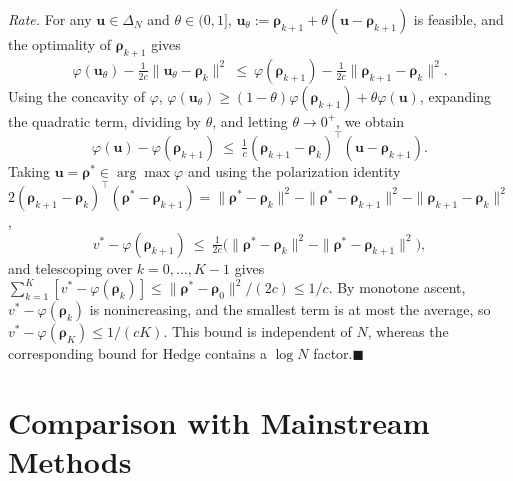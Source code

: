 \documentclass{article} %
\theoremstyle{plain}
\theoremstyle{remark}
\newcommand{\simplex}{\Delta}
\newcommand{\bu}{{\bm{u}}}
\newcommand{\brho}{{\bm{\rho}}}
\begin{document}
\textit{Rate.} For any $\bu\in\simplex_N$ and $\theta\in(0,1]$, $\bu_\theta:=\brho_{k+1}+\theta(\bu-\brho_{k+1})$ is feasible, and the optimality of $\brho_{k+1}$ gives
\[
\varphi(\bu_\theta)-\tfrac1{2c}\|\bu_\theta-\brho_k\|^2\ \le\ \varphi(\brho_{k+1})-\tfrac1{2c}\|\brho_{k+1}-\brho_k\|^2 .
\]
Using the concavity of $\varphi$, $\varphi(\bu_\theta)\ge(1-\theta)\varphi(\brho_{k+1})+\theta\varphi(\bu)$, expanding the quadratic term, dividing by $\theta$, and letting $\theta\to0^+$, we obtain
\[
\varphi(\bu)-\varphi(\brho_{k+1})\ \le\ \tfrac1c(\brho_{k+1}-\brho_k)^\top(\bu-\brho_{k+1}) .
\]
Taking $\bu=\brho^*\in\arg\max\varphi$ and using the polarization identity $2(\brho_{k+1}-\brho_k)^\top(\brho^*-\brho_{k+1})=\|\brho^*-\brho_k\|^2-\|\brho^*-\brho_{k+1}\|^2-\|\brho_{k+1}-\brho_k\|^2$,
\[
v^*-\varphi(\brho_{k+1})\ \le\ \tfrac1{2c}\big(\|\brho^*-\brho_k\|^2-\|\brho^*-\brho_{k+1}\|^2\big),
\]
and telescoping over $k=0,\dots,K-1$ gives $\sum_{k=1}^K[v^*-\varphi(\brho_k)]\le\|\brho^*-\brho_0\|^2/(2c)\le1/c$. By monotone ascent, $v^*-\varphi(\brho_k)$ is nonincreasing, and the smallest term is at most the average, so $v^*-\varphi(\brho_K)\le1/(cK)$. This bound is independent of $N$, whereas the corresponding bound for Hedge contains a $\log N$ factor.\hfill$\blacksquare$

\section{Comparison with Mainstream Methods}
\label{app:related}
\end{document}
